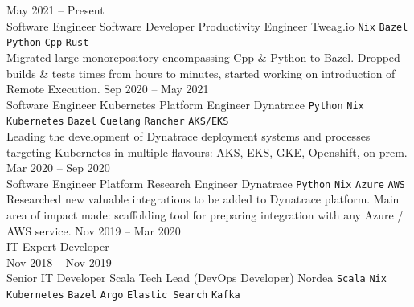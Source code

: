 \documentclass[9pt]{style/developercv}
\begin{document}
\begin{entrylist}
	\entry
	  {May 2021 -- Present\\\footnotesize{Software Engineer}}
		{Software Developer Productivity Engineer}
		{Tweag.io}
		{
			\texttt{Nix}\slashsep
			\texttt{Bazel}\slashsep
			\texttt{Python}\slashsep
			\texttt{Cpp}\slashsep
			\texttt{Rust}\\

			Migrated large monorepository encompassing Cpp \& Python to Bazel.
			Dropped builds \& tests times from hours to minutes, started working on introduction of Remote Execution.
	  }
	\entry
	  {Sep 2020 -- May 2021 \\\footnotesize{Software Engineer}}
		{Kubernetes Platform Engineer}
		{Dynatrace}
		{
			\texttt{Python}\slashsep
			\texttt{Nix}\slashsep
			\texttt{Kubernetes}\slashsep
			\texttt{Bazel}\slashsep
			\texttt{Cuelang}\slashsep
			\texttt{Rancher}\slashsep
			\texttt{AKS/EKS}\\

			Leading the development of Dynatrace deployment systems and processes targeting Kubernetes in
			multiple flavours: AKS, EKS, GKE, Openshift, on prem.
	  }
	\entry
	  {Mar 2020 -- Sep 2020\\\footnotesize{Software Engineer}}
		{Platform Research Engineer}
		{Dynatrace}
		{
			\texttt{Python}\slashsep
			\texttt{Nix}\slashsep
			\texttt{Azure}\slashsep
			\texttt{AWS}\\

			Researched new valuable integrations to be added to Dynatrace platform. 
			Main area of impact made: scaffolding tool for preparing integration with any
			Azure / AWS service.
	  }
	\entry
		{Nov 2019 -- Mar 2020\\\footnotesize{IT Expert Developer}
		\\Nov 2018 -- Nov 2019\\\footnotesize{Senior IT Developer}}
		{Scala Tech Lead (DevOps Developer)}
		{Nordea}
		{
			\texttt{Scala}\slashsep
			\texttt{Nix}\slashsep
			\texttt{Kubernetes}\slashsep
			\texttt{Bazel}\slashsep
			\texttt{Argo}\slashsep
			\texttt{Elastic Search}\slashsep
			\texttt{Kafka}\\

}
\end{entrylist}
\end{document}
